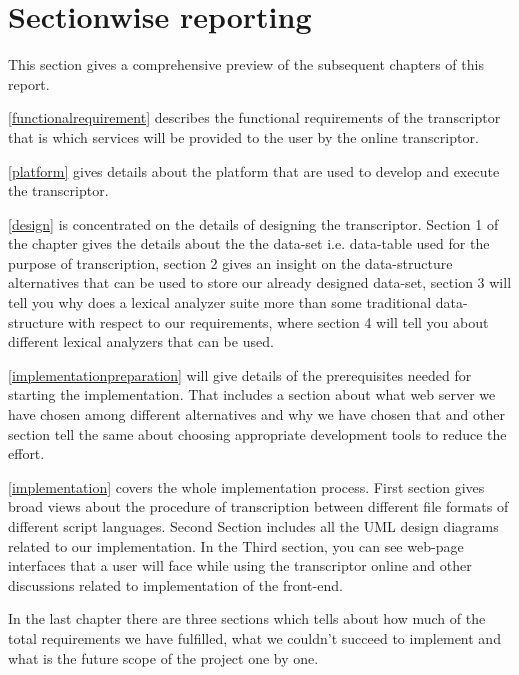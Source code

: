 \documentclass[12pt,oneside,openany,a4paper]{book}
\begin{document}
\section{Sectionwise reporting}
This section gives a comprehensive preview of the subsequent chapters of this report. 
\par \vspace{0.3cm}
\autoref{functionalrequirement} describes the functional requirements of the transcriptor that is which services will be provided to the user by the online transcriptor. 
\par \vspace{0.3cm}
\autoref{platform} gives details about the platform that are used to develop and execute the transcriptor.
\par \vspace{0.3cm}
\autoref{design} is concentrated on the details of designing the transcriptor.  Section 1 of the chapter gives the details about the the data-set i.e. data-table used for the purpose of transcription, section 2 gives an insight on the data-structure alternatives that can be used to store our already designed data-set, section 3 will tell you why does a lexical analyzer suite more than some traditional data-structure with respect to our requirements, where section 4 will tell you about different lexical analyzers that can be used.
\par \vspace{0.3cm}
\autoref{implementationpreparation} will give details of the prerequisites needed for starting the implementation. That includes a section about what web server we have chosen among different alternatives and why we have chosen that and other section tell the same about choosing appropriate development tools to reduce the effort.
\par \vspace{0.3cm}
\autoref{implementation} covers the whole implementation process. First section gives broad views about the procedure of transcription between different file formats of different script languages. Second Section includes all the UML design diagrams related to our implementation. In the Third section, you can see web-page interfaces that a user will face while using the transcriptor online and other discussions related to implementation of the front-end.
\par \vspace{0.3cm}
In the last chapter there are three sections which tells about how much of the total requirements we have fulfilled, what we couldn't succeed to implement and what is the future scope of the project one by one. 
\end{document}
